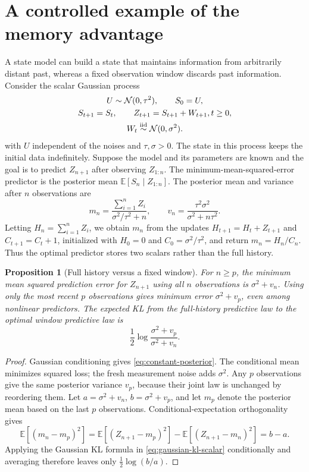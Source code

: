\documentclass[11pt,twoside]{article}
\newcommand{\E}{\mathbb E}
\newtheorem{proposition}[theorem]{Proposition}
\theoremstyle{definition}
\theoremstyle{remark}
\begin{document}
\section{A controlled example of the memory advantage}
\label{sec:memory-example}

A state model can build a state that maintains information
from arbitrarily distant past,
whereas a fixed observation window discards past information.
Consider the scalar Gaussian process
\begin{equation}
 \begin{gathered}
 U\sim\mathcal N(0,\tau^2),\qquad S_0=U,\\
 S_{t+1}=S_t,\qquad Z_{t+1}=S_{t+1}+W_{t+1},\quad t\ge0,\\
 W_t\stackrel{\rm iid}{\sim}\mathcal N(0,\sigma^2).
 \end{gathered}
 \label{eq:constant-state}
\end{equation}
with \(U\) independent of the noises and \(\tau,\sigma>0\).
The state in this process keeps the initial data indefinitely.
Suppose the model and its parameters are known and the goal is to predict
\(Z_{n+1}\) after observing \(Z_{1:n}\). The minimum-mean-squared-error
predictor is the posterior mean \(\E[S_n\mid Z_{1:n}]\).
The posterior mean and variance after \(n\)
observations are
\begin{equation}
 m_n=\frac{\sum_{i=1}^n Z_i}{\sigma^2/\tau^2+n},\qquad
 v_n=\frac{\tau^2\sigma^2}{\sigma^2+n\tau^2}.
 \label{eq:constant-posterior}
\end{equation}
Letting \(H_n=\sum_{i=1}^n Z_i\), we obtain \(m_n\) from the updates
\(H_{t+1}=H_t+Z_{t+1}\) and \(C_{t+1}=C_t+1\), initialized with
\(H_0=0\) and \(C_0=\sigma^2/\tau^2\), and return \(m_n=H_n/C_n\).
Thus the optimal predictor stores two scalars rather than the full history.
\begin{proposition}[Full history versus a fixed window]
\label{prop:memory-advantage}
For \(n\ge p\), the minimum mean squared prediction error for \(Z_{n+1}\)
using all \(n\) observations is \(\sigma^2+v_n\).
Using only the most recent \(p\) observations gives minimum error
\(\sigma^2+v_p\), even among nonlinear predictors.
The expected KL from the full-history predictive law to the optimal
window predictive law is
\[
 \frac12\log\frac{\sigma^2+v_p}{\sigma^2+v_n}.
\]
\end{proposition}
\begin{proof}
Gaussian conditioning gives \cref{eq:constant-posterior}.
The conditional mean minimizes squared loss; the fresh measurement noise
adds \(\sigma^2\). Any \(p\) observations give the same posterior variance
\(v_p\), because their joint law is unchanged by reordering them.
Let \(a=\sigma^2+v_n\), \(b=\sigma^2+v_p\), and let \(m_p\) denote the
posterior mean based on the last \(p\) observations. Conditional-expectation
orthogonality gives
\[
 \E[(m_n-m_p)^2]
 =\E[(Z_{n+1}-m_p)^2]-\E[(Z_{n+1}-m_n)^2]
 =b-a.
\]
Applying the Gaussian KL formula in \cref{eq:gaussian-kl-scalar} conditionally
and averaging therefore leaves only \(\tfrac12\log(b/a)\).
\end{proof}
\end{document}
